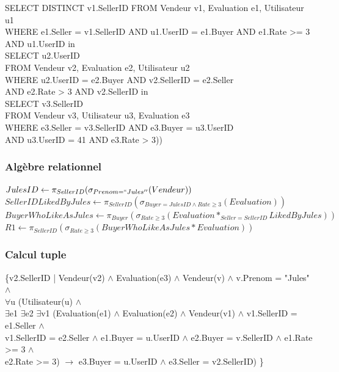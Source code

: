 \documentclass[a4paper,11pt]{article}
\begin{document}
SELECT DISTINCT v1.SellerID
FROM Vendeur v1, Evaluation e1, Utilisateur u1\\
WHERE e1.Seller = v1.SellerID AND u1.UserID = e1.Buyer AND e1.Rate >= 3 AND u1.UserID in \\
\indent \indent SELECT u2.UserID \\
\indent \indent FROM Vendeur v2, Evaluation e2, Utilisateur u2 \\
\indent \indent WHERE u2.UserID = e2.Buyer AND v2.SellerID = e2.Seller \\
\indent \indent AND e2.Rate > 3 AND v2.SellerID in \\
\indent \indent \indent \indent SELECT v3.SellerID\\
\indent \indent \indent \indent FROM Vendeur v3, Utilisateur u3, Evaluation e3\\
\indent \indent \indent \indent WHERE e3.Seller = v3.SellerID AND e3.Buyer = u3.UserID\\
\indent \indent \indent \indent AND u3.UserID = 41 AND e3.Rate > 3))

\subsubsection{Algèbre relationnel}

$JulesID \leftarrow \pi_{SellerID} ( \sigma_{Prenom=``Jules''} (Vendeur)) $ \\
$SellerIDLikedByJules \leftarrow \pi_{SellerID}(\sigma_{Buyer=JulesID \wedge Rate \geq 3} (Evaluation))$\\
$BuyerWhoLikeAsJules \leftarrow \pi_{Buyer}(\sigma_{Rate \geq 3}(Evaluation *_{Seller=SellerID} LikedByJules))$\\
$R1 \leftarrow \pi_{SellerID}(\sigma_{Rate \geq 3}(BuyerWhoLikeAsJules*Evaluation))$

\subsubsection{Calcul tuple}

\{v2.SellerID | Vendeur(v2) $\land$ Evaluation(e3) $\land$ Vendeur(v) $\land$ v.Prenom = "Jules" $\land$\\
$\forall$u (Utilisateur(u) $\land$ \\
$\exists$e1 $\exists$e2 $\exists$v1 (Evaluation(e1) $\land$ Evaluation(e2) $\land$ Vendeur(v1)
$\land$ v1.SellerID = e1.Seller $\land$ \\v1.SellerID = e2.Seller $\land$
e1.Buyer = u.UserID $\land$ e2.Buyer = v.SellerID
$\land$ e1.Rate >= 3 $\land$ \\ e2.Rate >= 3)
$\rightarrow$ e3.Buyer = u.UserID $\land$ e3.Seller = v2.SellerID) \}
\end{document}
